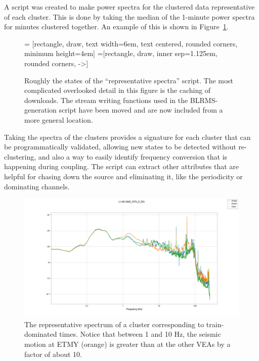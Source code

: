 \documentclass[colorlinks=true,pdfstartview=FitV,linkcolor=blue,
            citecolor=red,urlcolor=magenta]{ligodoc}
\begin{document}
A script was created to make power spectra for the clustered data representative of each cluster.
This is done by taking the median of the 1-minute power spectra for minutes clustered together.
An example of this is shown in Figure~\ref{fig:reps}.
\begin{figure}[h]
   = [rectangle, draw, text width=6em, text centered, rounded corners, minimum height=4em]
   =[rectangle, draw, inner sep=1.125em, rounded corners, ->]
  \caption{Roughly the states of the ``representative spectra'' script. The most complicated overlooked detail in this figure is the caching of downloads. The stream writing functions used in the BLRMS-generation script have been moved and are now included from a more general location.}
\end{figure}

Taking the spectra of the clusters provides a signature for each cluster that can be programmatically validated, allowing new states to be detected without re-clustering, and also a way to easily identify frequency conversion that is happening during coupling.
The script can extract other attributes that are helpful for chasing down the source and eliminating it, like the periodicity or dominating channels.
\begin{figure}
  \includegraphics[width=\textwidth]{assets/report2/0-L1:ISI-GND_STS_Z_DQ.png}
  \caption{The representative spectrum of a cluster corresponding to train-dominated times. Notice that between 1 and 10 Hz, the seismic motion at ETMY (orange) is greater than at the other VEAs by a factor of about 10.}\label{fig:reps}
\end{figure}
\end{document}
